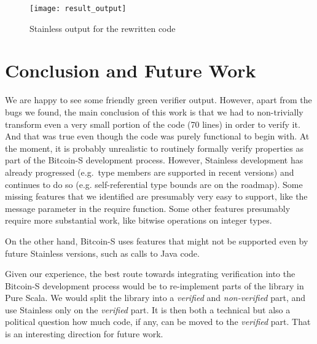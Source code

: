 \documentclass[hyphens, a4paper,USenglish,cleveref, autoref, thm-restate]{oasics-v2019}
\begin{document}
\begin{figure}
	\centering
		\texttt{[image: result\_output]}
	\caption{Stainless output for the rewritten code}
  \label{fig:result}
\end{figure}


\section{Conclusion and Future Work}

We are happy to see some friendly green verifier output. However,
apart from the bugs we found, the main conclusion of this work is that
we had to non-trivially transform even a very small portion of the
code (70 lines) in order to verify it. And that was true even though
the code was purely functional to begin with. At the moment, it is
probably unrealistic to routinely formally verify properties as part
of the Bitcoin-S development process. However, Stainless development
has already progressed (e.g.\ type members are supported in recent
versions) and continues to do so (e.g. self-referential type bounds
are on the roadmap). Some missing features that we identified are
presumably very easy to support, like the message parameter in the
require function. Some other features presumably require more
substantial work, like bitwise operations on integer types.

On the other hand, Bitcoin-S uses features that might not be supported
even by future Stainless versions, such as calls to Java code.

Given our experience, the best route towards integrating verification
into the Bitcoin-S development process would be to re-implement parts
of the library in Pure Scala. We would split the library into a
\emph{verified} and \emph{non-verified} part, and use Stainless only
on the \emph{verified} part. It is then both a technical but also a
political question how much code, if any, can be moved to the
\emph{verified} part. That is an interesting direction for future
work.

\appendix


\end{document}
